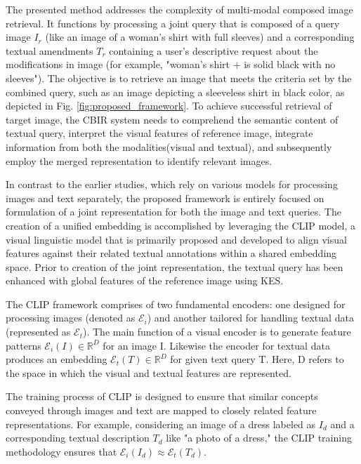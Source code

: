\documentclass[10pt,lineno]{wlpeerj}
\begin{document}
The presented method addresses the complexity of multi-modal composed image retrieval. It functions by processing a joint query that is composed of a query image $I_r$ (like an image of a woman's shirt with full sleeves) and a corresponding textual amendments $T_r$ containing a user's descriptive request about the modifications in image (for example, "woman's shirt + is solid black with no sleeves"). The objective is to retrieve an image that meets the criteria set by the combined query, such as an image depicting a sleeveless shirt in black color, as depicted in Fig. \ref{fig:proposed_framework}. To achieve successful retrieval of target image, the CBIR system needs to comprehend the semantic content of textual query, interpret the visual features of reference image, integrate information from both the modalities(visual and textual), and subsequently employ the merged representation to identify relevant images.

In contrast to the earlier studies, which rely on various models for processing images and text separately, the proposed framework is entirely focused on formulation of a joint representation for both the image and text queries. 
The creation of a unified embedding is accomplished by leveraging the CLIP \citep{CLIP} model, a visual linguistic model that is primarily proposed and developed to align visual features against their related textual annotations within a shared embedding space. Prior to creation of the joint representation, the textual query has been enhanced with global features of the reference image  using KES.   

The CLIP framework comprises of two fundamental encoders: one designed for processing images (denoted as $\mathcal{E}_i$) and another tailored for handling textual data (represented as $\mathcal{E}_t$). The main function of a visual encoder is to generate feature patterns $\mathcal{E}_i(I) \in \mathbb{R}^D$ for an image I. Likewise the encoder for textual data produces an embedding $\mathcal{E}_t(T) \in \mathbb{R}^D$ for given text query T. Here, D refers to the space in which the visual and textual features are represented.

The training process of CLIP is designed to ensure that similar concepts conveyed through images and text are mapped to closely related feature representations. For example, considering an image of a dress labeled as $I_d$ and a corresponding textual description $T_d$ like "a photo of a dress," the CLIP training methodology ensures that $\mathcal{E}_i(I_d) \approx \mathcal{E}_t(T_d)$.
\end{document}
